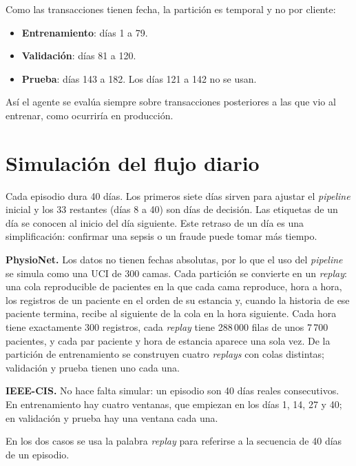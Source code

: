 Como las transacciones tienen fecha, la partición es temporal y no por cliente:

\begin{itemize}
    \item \textbf{Entrenamiento}: días 1 a 79.
    \item \textbf{Validación}: días 81 a 120.
    \item \textbf{Prueba}: días 143 a 182. Los días 121 a 142 no se usan.
\end{itemize}

Así el agente se evalúa siempre sobre transacciones posteriores a las que vio al entrenar, como
ocurriría en producción.

\section{Simulación del flujo diario}
\label{sec:met_uci}

Cada episodio dura 40 días. Los primeros siete días sirven para ajustar el \textit{pipeline}
inicial y los 33 restantes (días 8 a 40) son días de decisión. Las etiquetas de un día se
conocen al inicio del día siguiente. Este retraso de un día es una simplificación: confirmar
una sepsis o un fraude puede tomar más tiempo.

\textbf{PhysioNet.} Los datos no tienen fechas absolutas, por lo que el uso del
\textit{pipeline} se simula como una UCI de 300 camas. Cada partición se convierte en un
\textit{replay}: una cola reproducible de pacientes en la que cada cama reproduce, hora a hora,
los registros de un paciente en el orden de su estancia y, cuando la historia de ese paciente
termina, recibe al siguiente de la cola en la hora siguiente. Cada hora tiene exactamente 300
registros, cada \textit{replay} tiene 288\,000 filas de unos 7\,700 pacientes, y cada par
paciente y hora de estancia aparece una sola vez. De la partición de entrenamiento se construyen
cuatro \textit{replays} con colas distintas; validación y prueba tienen uno cada una.

\textbf{IEEE-CIS.} No hace falta simular: un episodio son 40 días reales consecutivos. En
entrenamiento hay cuatro ventanas, que empiezan en los días 1, 14, 27 y 40; en validación y
prueba hay una ventana cada una.

En los dos casos se usa la palabra \textit{replay} para referirse a la secuencia de 40 días de un
episodio.

